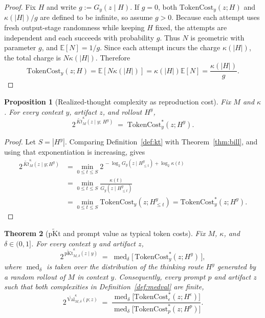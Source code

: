 \documentclass[letterpaper]{article} %
\newtheorem{theorem}{Theorem}[section]
\newtheorem{proposition}[theorem]{Proposition}
\theoremstyle{definition}
\theoremstyle{remark}
\newcommand{\E}{\mathbb{E}}
\newcommand{\Val}{\mathrm{Val}}
\newcommand{\eps}{\epsilon}
\newcommand{\TC}{\mathrm{TokenCost}}
\DeclareMathOperator{\med}{med}
\newcommand{\pKt}{\mathrm{pKt}}
\newcommand{\pKtt}{\widetilde{\pKt}}
\begin{document}
\begin{proof}
Fix \(H\) and write \(g:=G_y(z\mid H)\). If \(g=0\), both
\(\TC_y(z;H)\) and \(\kappa(|H|)/g\) are defined to be infinite, so assume
\(g>0\). Because each attempt uses fresh output-stage randomness while keeping
\(H\) fixed, the attempts are independent and each succeeds with probability
\(g\). Thus \(N\) is geometric with parameter \(g\), and
\(\E[N]=1/g\). Since each attempt incurs the charge \(\kappa(|H|)\), the total
charge is \(N\kappa(|H|)\). Therefore
\[
\TC_y(z;H)
=
\E\!\left[N\kappa(|H|)\right]
=
\kappa(|H|)\E[N]
=
\frac{\kappa(|H|)}{g}.
\]
\end{proof}

\begin{proposition}[Realized-thought complexity as reproduction cost]
\label{prop:kttc}
Fix $M$ and $\kappa$. For every context $y$, artifact $z$, and rollout $H^y$,
\begin{equation}\label{eq:kttc}
2^{\,\widetilde{Kt}^{\kappa}_M(z \mid y;\, H^y)} \;=\; \TC^*_y(z; H^y).
\end{equation}
\end{proposition}

\begin{proof}
Let $S=|H^y|$. Comparing Definition~\ref{def:kt} with
Theorem~\ref{thm:bill}, and using that exponentiation is increasing, gives
\begin{align*}
2^{\,\widetilde{Kt}^{\kappa}_M(z\mid y;H^y)}
&=
\min_{0\le t\le S}
2^{\,-\log_2G_y(z\mid H^y_{\le t})+\log_2\kappa(t)}\\
&=
\min_{0\le t\le S}
\frac{\kappa(t)}{G_y(z\mid H^y_{\le t})}\\
&=
\min_{0\le t\le S}\TC_y(z;H^y_{\le t})
=\TC_y^*(z;H^y).
\end{align*}
\end{proof}

\begin{theorem}[$\pKtt$ and prompt value as typical token costs]
\label{thm:pktcost}
Fix \(M\), \(\kappa\), and \(\delta\in(0,1]\). For every context \(y\) and
artifact \(z\),
\[
2^{\,\pKtt^{\kappa}_{M,\delta}(z \mid y)}
\;=\;
\med_{\delta}\bigl[\,\TC^*_y(z;H^y)\,\bigr],
\]
where \(\med_{\delta}\) is taken over the distribution of the thinking route
\(H^y\) generated by a random rollout of \(M\) in context \(y\).
Consequently, every prompt $p$ and artifact $z$ such that both complexities in
Definition~\ref{def:medval} are finite,
\[
2^{\,\widetilde{\Val}^{\kappa}_{M,\delta}(p;z)}
\;=\;
\frac{\med_{\delta}\bigl[\TC^*_\eps(z; H^\eps)\bigr]}
     {\med_{\delta}\bigl[\TC^*_p(z; H^p)\bigr]} .
\]
\end{theorem}
\end{document}
